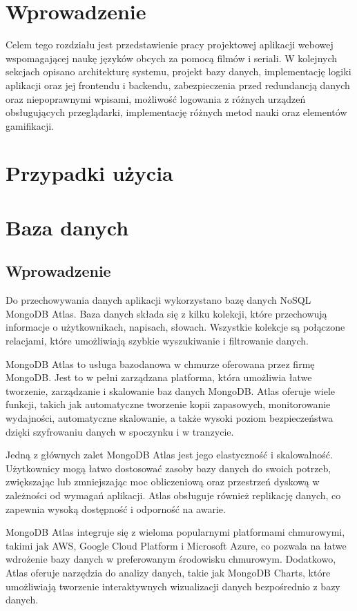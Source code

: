 



\section{Wprowadzenie}
Celem tego rozdziału jest przedstawienie pracy projektowej aplikacji webowej wspomagającej naukę języków obcych za pomocą filmów i seriali. W kolejnych sekcjach opisano architekturę systemu, projekt bazy danych, implementację logiki aplikacji oraz jej frontendu i backendu, zabezpieczenia przed redundancją danych oraz niepoprawnymi wpisami, możliwość logowania z różnych urządzeń obsługujących przeglądarki, implementację różnych metod nauki oraz elementów gamifikacji.
\section{Przypadki użycia}

\section{Baza danych}

\subsection{Wprowadzenie}
Do przechowywania danych aplikacji wykorzystano bazę danych NoSQL MongoDB Atlas. Baza danych składa się z kilku kolekcji, które przechowują informacje o użytkownikach, napisach, słowach. Wszystkie kolekcje są połączone relacjami, które umożliwiają szybkie wyszukiwanie i filtrowanie danych.

MongoDB Atlas to usługa bazodanowa w chmurze oferowana przez firmę MongoDB. Jest to w pełni zarządzana platforma, która umożliwia łatwe tworzenie, zarządzanie i skalowanie baz danych MongoDB. Atlas oferuje wiele funkcji, takich jak automatyczne tworzenie kopii zapasowych, monitorowanie wydajności, automatyczne skalowanie, a także wysoki poziom bezpieczeństwa dzięki szyfrowaniu danych w spoczynku i w tranzycie.

Jedną z głównych zalet MongoDB Atlas jest jego elastyczność i skalowalność. Użytkownicy mogą łatwo dostosować zasoby bazy danych do swoich potrzeb, zwiększając lub zmniejszając moc obliczeniową oraz przestrzeń dyskową w zależności od wymagań aplikacji. Atlas obsługuje również replikację danych, co zapewnia wysoką dostępność i odporność na awarie.

MongoDB Atlas integruje się z wieloma popularnymi platformami chmurowymi, takimi jak AWS, Google Cloud Platform i Microsoft Azure, co pozwala na łatwe wdrożenie bazy danych w preferowanym środowisku chmurowym. Dodatkowo, Atlas oferuje narzędzia do analizy danych, takie jak MongoDB Charts, które umożliwiają tworzenie interaktywnych wizualizacji danych bezpośrednio z bazy danych. 


